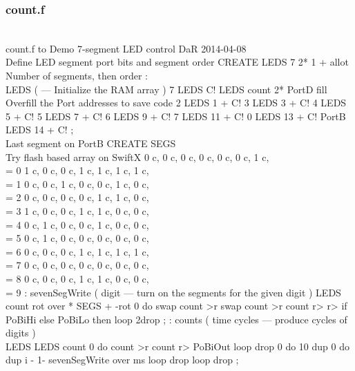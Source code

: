 \documentclass[10pt,english]{article}
\begin{document}
\subsubsection{count.f}

\nwenddocs{}\endmoddef
\\ count.f to Demo 7-segment LED control      DaR 2014-04-08
\\ Define LED segment port bits and segment order
CREATE LEDS   7 2* 1 + allot \\ Number of segments, then order
: \\LEDS ( --- Initialize the RAM array )   7 LEDS C!
   LEDS count 2* PortD fill \\ Overfill the Port addresses to save code
   2 LEDS 1 + C!  3 LEDS 3 + C!  4 LEDS 5 + C!  5 LEDS 7 + C!
   6 LEDS 9 + C!  7 LEDS 11 + C!  0 LEDS 13 + C!
   PortB LEDS 14 + C! ; \\ Last segment on PortB
CREATE SEGS \\ Try flash based array on SwiftX
   0 c, 0 c, 0 c, 0 c, 0 c, 0 c, 1 c, \\ = 0
   1 c, 0 c, 0 c, 1 c, 1 c, 1 c, 1 c, \\ = 1
   0 c, 0 c, 1 c, 0 c, 0 c, 1 c, 0 c, \\ = 2
   0 c, 0 c, 0 c, 0 c, 1 c, 1 c, 0 c, \\ = 3
   1 c, 0 c, 0 c, 1 c, 1 c, 0 c, 0 c, \\ = 4
   0 c, 1 c, 0 c, 0 c, 1 c, 0 c, 0 c, \\ = 5
   0 c, 1 c, 0 c, 0 c, 0 c, 0 c, 0 c, \\ = 6
   0 c, 0 c, 0 c, 1 c, 1 c, 1 c, 1 c, \\ = 7
   0 c, 0 c, 0 c, 0 c, 0 c, 0 c, 0 c, \\ = 8
   0 c, 0 c, 0 c, 1 c, 1 c, 0 c, 0 c, \\ = 9
: sevenSegWrite ( digit --- turn on the segments for the given digit )
   LEDS count  rot over * SEGS +  -rot 0 do
      swap count >r  swap count >r count r>  r> if
         PoBiHi  else  PoBiLo
      then
   loop  2drop ;
: counts ( time cycles --- produce cycles of digits )   \\LEDS
   LEDS count 0 do  count >r count r> PoBiOut  loop  drop
   0 do  10 dup 0 do  dup i - 1- sevenSegWrite  over ms
   loop  drop  loop  drop ;
\nwendcode{}\nwdocspar
\end{document}
